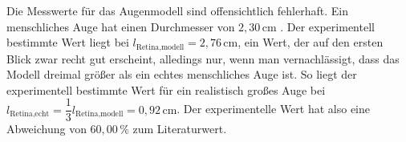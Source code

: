 Die Messwerte für das Augenmodell sind offensichtlich fehlerhaft. 
Ein menschliches Auge hat einen Durchmesser von $ 2,30 \, \unit{\centi\meter} $ \cite{ap07}.
Der experimentell bestimmte Wert liegt bei $l_\text{Retina,modell} = 2,76 \,\unit{\centi\meter}$, ein Wert, der auf den ersten Blick zwar recht gut erscheint,
alledings nur, wenn man vernachlässigt, dass das Modell dreimal größer als ein echtes menschliches Auge ist.
So liegt der experimentell bestimmte Wert für ein realistisch großes Auge bei
$ l_\text{Retina,echt} = \dfrac{1}{3} l_\text{Retina,modell} = 0,92 \, \unit{\centi\meter}$.
Der experimentelle Wert hat also eine Abweichung von $ 60,00 \, \% $ zum Literaturwert.